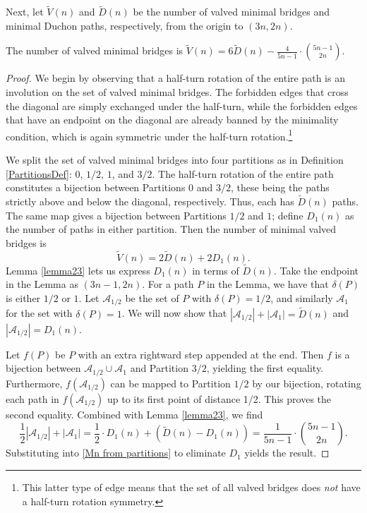 \documentclass[10pt]{article}
\newcommand{\eqn}[1]{\begin{equation*} #1 \end{equation*}}
\newcommand{\abs}[1]{\left\vert #1 \right\vert}
\begin{document}
Next, let $\widetilde{V}(n)$ and $\widetilde{D}(n)$ be the number of valved minimal bridges and minimal Duchon paths, respectively, from the origin to $(3n,2n)$. 
\begin{theorem}
The number of valved minimal bridges is $\displaystyle \widetilde{V}(n)=6\widetilde{D}(n) - \frac{4}{5n-1}\cdot\binom{5n-1}{2n}$.
\end{theorem}

\begin{proof}
We begin by observing that a half-turn rotation of the entire path is an involution on the set of valved minimal bridges.  The forbidden edges that cross the diagonal are simply exchanged under the half-turn, while the forbidden edges that have an endpoint on the diagonal are already banned by the minimality condition, which is again symmetric under the half-turn rotation.\footnote{This latter type of edge means that the set of all valved bridges does \textit{not} have a half-turn rotation symmetry.}

We split the set of valved minimal bridges into four partitions as in Definition \ref{PartitionsDef}: $0$, $1/2$, $1$, and $3/2$. The half-turn rotation of the entire path constitutes a bijection between Partitions $0$ and $3/2$, these being the paths strictly above and below the diagonal, respectively. Thus, each has $\widetilde{D}(n)$ paths. The same map gives a bijection between Partitions $1/2$ and $1$; define $D_1(n)$ as the number of paths in either partition. Then the number of minimal valved bridges is
\begin{equation}
\label{Mn from partitions}
\widetilde{V}(n)=2\widetilde{D}(n) + 2D_1(n).
\end{equation}
Lemma \ref{lemma23} lets us express $D_1(n)$ in terms of $\widetilde{D}(n)$. Take the endpoint in the Lemma as $(3n-1,2n)$. For a path $P$ in the Lemma, we have that $\delta(P)$ is either $1/2$ or $1$. Let $\mathcal{A}_{1/2}$ be the set of $P$ with $\delta(P)=1/2$, and similarly $\mathcal{A}_1$ for the set with $\delta(P)=1$. We will now show that $|\mathcal{A}_{1/2}|+|\mathcal{A}_1|=\widetilde{D}(n)$ and $|\mathcal{A}_{1/2}|=D_1(n)$.

Let $f(P)$ be $P$ with an extra rightward step appended at the end. Then $f$ is a bijection between $\mathcal{A}_{1/2} \cup \mathcal{A}_1$ and Partition $3/2$, yielding the first equality. Furthermore, $f(\mathcal{A}_{1/2})$ can be mapped to Partition $1/2$ by our bijection, rotating each path in $f(\mathcal{A}_{1/2})$ up to its first point of distance 1/2. This proves the second equality. Combined with Lemma \ref{lemma23}, we find
\eqn{\frac{1}{2} \abs{\mathcal{A}_{1/2}} + \abs{\mathcal{A}_1} = \frac{1}{2} \cdot D_1(n) + (\widetilde{D}(n) - D_1(n)) = \frac{1}{5n-1} \cdot \binom{5n-1}{2n}.}
Substituting into \ref{Mn from partitions} to eliminate $D_1$ yields the result.
\end{proof}
\end{document}

